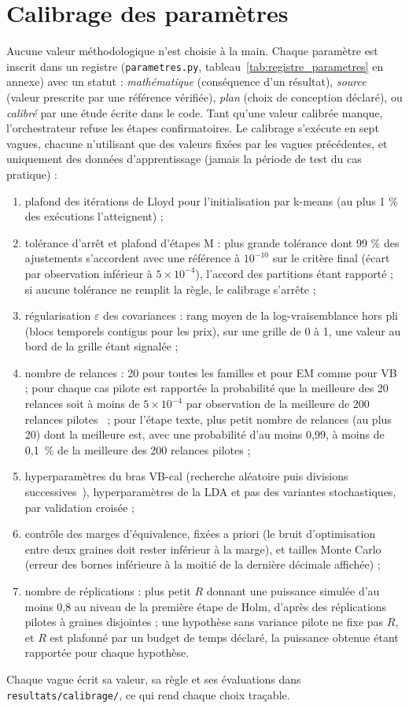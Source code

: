 \section{Calibrage des paramètres}\label{sec:calibrage}
Aucune valeur méthodologique n'est choisie à la main. Chaque paramètre est inscrit dans un registre (\texttt{parametres.py}, tableau~\ref{tab:registre_parametres} en annexe) avec un statut : \emph{mathématique} (conséquence d'un résultat), \emph{source} (valeur prescrite par une référence vérifiée), \emph{plan} (choix de conception déclaré), ou \emph{calibré} par une étude écrite dans le code. Tant qu'une valeur calibrée manque, l'orchestrateur refuse les étapes confirmatoires. Le calibrage s'exécute en sept vagues, chacune n'utilisant que des valeurs fixées par les vagues précédentes, et uniquement des données d'apprentissage (jamais la période de test du cas pratique) :
\begin{enumerate}
\item plafond des itérations de Lloyd pour l'initialisation par k-means (au plus 1 \% des exécutions l'atteignent) ;
\item tolérance d'arrêt et plafond d'étapes M : plus grande tolérance dont 99 \% des ajustements s'accordent avec une référence à $10^{-10}$ sur le critère final (écart par observation inférieur à $5 \times 10^{-4}$), l'accord des partitions étant rapporté ; si aucune tolérance ne remplit la règle, le calibrage s'arrête ;
\item régularisation $\varepsilon$ des covariances : rang moyen de la log-vraisemblance hors pli (blocs temporels contigus pour les prix), sur une grille de 0 à 1, une valeur au bord de la grille étant signalée ;
\item nombre de relances : 20 pour toutes les familles et pour EM comme pour VB ; pour chaque cas pilote est rapportée la probabilité que la meilleure des 20 relances soit à moins de $5 \times 10^{-4}$ par observation de la meilleure de 200 relances pilotes~\cite{biernacki2003} ; pour l'étape texte, plus petit nombre de relances (au plus 20) dont la meilleure est, avec une probabilité d'au moins 0,99, à moins de 0,1~\% de la meilleure des 200 relances pilotes ;
\item hyperparamètres du bras VB-cal (recherche aléatoire puis divisions successives~\cite{bergstra2012,jamieson2016}), hyperparamètres de la LDA et pas des variantes stochastiques, par validation croisée ;
\item contrôle des marges d'équivalence, fixées a priori (le bruit d'optimisation entre deux graines doit rester inférieur à la marge), et tailles Monte Carlo (erreur des bornes inférieure à la moitié de la dernière décimale affichée) ;
\item nombre de réplications : plus petit $R$ donnant une puissance simulée d'au moins 0,8 au niveau de la première étape de Holm, d'après des réplications pilotes à graines disjointes ; une hypothèse sans variance pilote ne fixe pas $R$, et $R$ est plafonné par un budget de temps déclaré, la puissance obtenue étant rapportée pour chaque hypothèse.
\end{enumerate}
Chaque vague écrit sa valeur, sa règle et ses évaluations dans \texttt{resultats/calibrage/}, ce qui rend chaque choix traçable.

